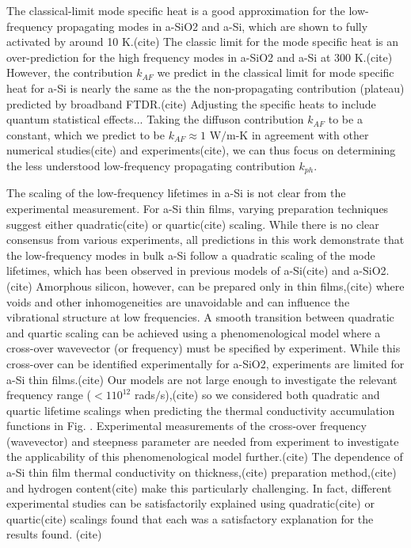 \documentclass[aps,prb,onecolumn,preprint,superscriptaddress,footinbib,amsmath,amssymb,floatfix]{revtex4}
\begin{document}
{{The classical-limit mode specific heat is a good approximation 
for the low-frequency propagating modes in a-SiO2 and a-Si, which are shown to 
fully activated by around 10 K.(cite) 
The classic limit for the mode specific heat is 
an over-prediction for the high frequency modes in a-SiO2 and a-Si at 300 K.(cite) 
However, the contribution $k_{AF}$ we predict in the classical limit 
for mode specific heat for a-Si is nearly the same as the 
the non-propagating contribution (plateau) predicted by broadband FTDR.(cite) 
Adjusting the specific heats to include quantum statistical effects...
Taking the diffuson contribution $k_{AF}$ to be a constant, which we predict 
to be $k_{AF} \approx 1$ W$/$m-K in agreement with other numerical 
studies(cite) and experiments(cite), 
we can thus focus on determining the less understood 
low-frequency propagating 
contribution $k_{ph}$. 

The scaling of the low-frequency lifetimes 
in a-Si is not clear from the experimental measurement. 
For a-Si thin films, varying preparation techniques suggest either 
quadratic(cite) or quartic(cite) scaling. 
While there is no clear consensus from various experiments, all predictions in this 
work demonstrate that  
the low-frequency modes in bulk a-Si follow a quadratic scaling 
of the mode lifetimes, which has been observed in previous models of 
a-Si(cite) and 
a-SiO2.(cite)
Amorphous silicon, however, can be
prepared only in thin films,(cite) where voids and other 
inhomogeneities are unavoidable\cite{li_effect_2011} and can influence the 
vibrational structure at low frequencies.
\cite{feldman_tight-binding_2004,liu_high_2009} 
A smooth transition between quadratic and quartic scaling can be 
achieved using a phenomenological model where a cross-over wavevector 
(or frequency) must be specified by experiment.
\cite{baldi_elastic_2011} While this cross-over can be identified 
experimentally for a-SiO2,\cite{masciovecchio_evidence_2006} 
experiments are limited for a-Si thin films.(cite) Our models 
are not large enough to investigate the relevant frequency range 
($< 1 10^{12}$ rads$/$s),(cite) so we considered both 
quadratic and quartic lifetime scalings when predicting 
the thermal conductivity accumulation functions in Fig. . 
Experimental measurements of the cross-over frequency (wavevector) and 
steepness parameter are needed from experiment to investigate the 
applicability of this phenomenological model further.(cite) 
The dependence 
of a-Si thin film thermal conductivity on thickness,(cite) 
preparation method,(cite) 
and hydrogen content(cite) make this particularly challenging. In fact, 
different experimental studies can be satisfactorily explained using 
quadratic(cite) or quartic(cite) scalings 
found that each was a satisfactory explanation for the results found.
(cite) 

}}
\end{document}
